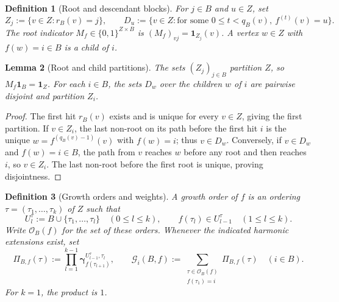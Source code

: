 \documentclass[11pt]{article}
\newtheorem{definition}{Definition}[section]
\newtheorem{lemma}[definition]{Lemma}
\newcommand{\one}{\mathbf 1}
\newcommand{\gam}{\boldsymbol\gamma}
\newcommand{\Ord}{\mathcal O}
\begin{document}
\begin{definition}[Root and descendant blocks]\label{def:blocks}
For $j\in B$ and $u\in Z$, set
\[
Z_j:=\{v\in Z:r_B(v)=j\},
\qquad
D_u:=\{v\in Z:\text{for some }0\leq t<q_B(v),\ f^{(t)}(v)=u\}.
\]
The root indicator $M_f\in\{0,1\}^{Z\times B}$ is
$(M_f)_{vj}=\mathbf1_{Z_j}(v)$.
A vertex $w\in Z$ with $f(w)=i\in B$ is a \emph{child} of $i$.
\end{definition}

\begin{lemma}[Root and child partitions]\label{lem:blocks}
The sets $(Z_j)_{j\in B}$ partition $Z$, so
$M_f\one_B=\one_Z$. For each $i\in B$, the sets $D_w$ over the
children $w$ of $i$ are pairwise disjoint and partition $Z_i$.
\end{lemma}
\begin{proof}
The first hit $r_B(v)$ exists and is unique for every $v\in Z$,
giving the first partition. If $v\in Z_i$, the last non-root on
its path before the first hit $i$ is the unique
$w=f^{(q_B(v)-1)}(v)$ with $f(w)=i$; thus $v\in D_w$.
Conversely, if $v\in D_w$ and $f(w)=i\in B$, the path from $v$
reaches $w$ before any root and then reaches $i$, so $v\in Z_i$.
The last non-root before the first root is unique, proving
disjointness.
\end{proof}

\begin{definition}[Growth orders and weights]\label{def:orders}
A \emph{growth order} of $f$ is an ordering
$\tau=(\tau_1,\ldots,\tau_k)$ of $Z$ such that
\[
U_l^{\tau}:=B\cup\{\tau_1,\ldots,\tau_l\}
\quad(0\leq l\leq k),\qquad
f(\tau_l)\in U_{l-1}^{\tau}
\quad(1\leq l\leq k).
\]
Write $\Ord_B(f)$ for the set of these orders. Whenever the
indicated harmonic extensions exist, set
\[
\Pi_{B,f}(\tau):=
\prod_{l=1}^{k-1}
  \gam^{U_{l-1}^{\tau},\tau_l}_{f(\tau_{l+1})},
\qquad
\mathcal G_i(B,f):=
\sum_{\substack{\tau\in\Ord_B(f)\\ f(\tau_1)=i}}
  \Pi_{B,f}(\tau)\quad(i\in B).
\]
For $k=1$, the product is $1$.
\end{definition}
\end{document}
